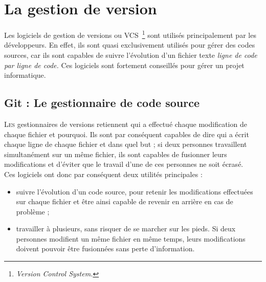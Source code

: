 \chapter{La gestion de version} %
\label{cha:La gestion de version}

\begin{it}
Les logiciels de gestion de versions ou VCS\, \footnote{\emph{Version
Control System.}} sont utilisés principalement par les développeurs. En
effet, ils sont quasi exclusivement utilisés pour gérer des codes
sources, car ils sont capables de suivre l’évolution d’un fichier texte
\emph{ligne de code par ligne de code.} Ces logiciels sont fortement
conseillés pour gérer un projet informatique.
\end{it}

\section{Git : Le gestionnaire de code source} %
\label{sec:Git : Le gestionnaire de code source}

\lettrine{L}{es} gestionnaires de versions retiennent qui a effectué
chaque modification de chaque fichier et pourquoi. Ils sont par
conséquent capables de dire qui a écrit chaque ligne de chaque fichier
et dans quel but ; si deux personnes travaillent simultanément sur un
même fichier, ils sont capables de fusionner leurs modifications et
d’éviter que le travail d’une de ces personnes ne soit écrasé.\\

Ces logiciels ont donc par conséquent deux utilités principales :
\begin{itemize}

  \item suivre l’évolution d’un code source, pour retenir les
    modifications effectuées sur chaque fichier et être ainsi capable de
    revenir en arrière en cas de problème ;

  \item travailler à plusieurs, sans risquer de se marcher sur les
    pieds.  Si deux personnes modifient un même fichier en même temps,
    leurs modifications doivent pouvoir être fusionnées sans perte
    d’information.

\end{itemize}

